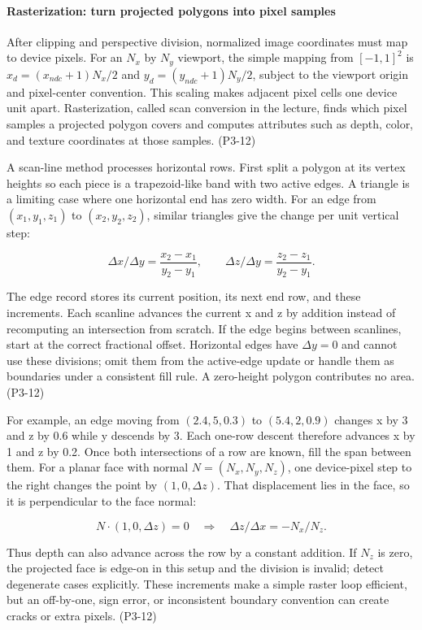 \paragraph{Rasterization: turn projected polygons into pixel samples}\label{rasterization-turn-projected-polygons-into-pixel-samples}

After clipping and perspective division, normalized image coordinates must map to device pixels. For an \(N_x\) by \(N_y\) viewport, the simple mapping from \([-1,1]^2\) is \(x_d=(x_{ndc}+1)N_x/2\) and \(y_d=(y_{ndc}+1)N_y/2\), subject to the viewport origin and pixel-center convention. This scaling makes adjacent pixel cells one device unit apart. Rasterization, called scan conversion in the lecture, finds which pixel samples a projected polygon covers and computes attributes such as depth, color, and texture coordinates at those samples. (P3-12)

A scan-line method processes horizontal rows. First split a polygon at its vertex heights so each piece is a trapezoid-like band with two active edges. A triangle is a limiting case where one horizontal end has zero width. For an edge from \((x_1,y_1,z_1)\) to \((x_2,y_2,z_2)\), similar triangles give the change per unit vertical step:

\[
\Delta x/\Delta y=\frac{x_2-x_1}{y_2-y_1},\qquad
\Delta z/\Delta y=\frac{z_2-z_1}{y_2-y_1}.
\]

The edge record stores its current position, its next end row, and these increments. Each scanline advances the current x and z by addition instead of recomputing an intersection from scratch. If the edge begins between scanlines, start at the correct fractional offset. Horizontal edges have \(\Delta y=0\) and cannot use these divisions; omit them from the active-edge update or handle them as boundaries under a consistent fill rule. A zero-height polygon contributes no area. (P3-12)

For example, an edge moving from \((2.4,5,0.3)\) to \((5.4,2,0.9)\) changes x by 3 and z by 0.6 while y descends by 3. Each one-row descent therefore advances x by 1 and z by 0.2. Once both intersections of a row are known, fill the span between them. For a planar face with normal \(N=(N_x,N_y,N_z)\), one device-pixel step to the right changes the point by \((1,0,\Delta z)\). That displacement lies in the face, so it is perpendicular to the face normal:

\[
N\cdot(1,0,\Delta z)=0\quad\Rightarrow\quad\Delta z/\Delta x=-N_x/N_z.
\]

Thus depth can also advance across the row by a constant addition. If \(N_z\) is zero, the projected face is edge-on in this setup and the division is invalid; detect degenerate cases explicitly. These increments make a simple raster loop efficient, but an off-by-one, sign error, or inconsistent boundary convention can create cracks or extra pixels. (P3-12)

